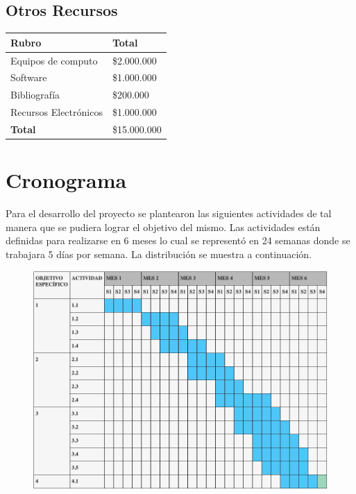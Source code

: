 \subsection{Otros Recursos}

\begin{table}[ht]
\centering
\begin{tabular}{|l|l|}
\hline
\textbf{Rubro}        & \textbf{Total} \\ \hline
Equipos de computo    & \$2.000.000   \\ \hline
Software              & \$1.000.000    \\ \hline
Bibliograf\'ia          & \$200.000    \\ \hline
Recursos Electr\'onicos & \$1.000.000    \\ \hline
\textbf{Total}        & \$15.000.000   \\ \hline
\end{tabular}
\end{table}





\newpage

\section{Cronograma}

Para el desarrollo del proyecto se plantearon las siguientes actividades de tal manera que se pudiera lograr el objetivo del mismo. Las actividades est\'an definidas para realizarse en 6 meses lo cual se represent\'o en 24 semanas donde se trabajara 5 d\'ias por semana. La distribuci\'on  se muestra a continuaci\'on.



\begin{figure}[ht]
\centering
\includegraphics[scale=0.5]{gant.png}
\end{figure}
\FloatBarrier

 



    





